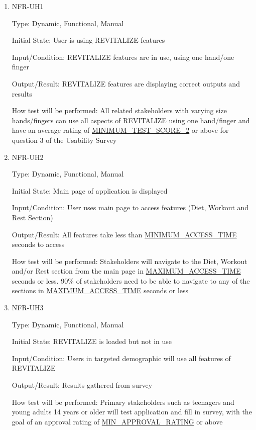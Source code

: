 \documentclass[12pt, titlepage]{article}
\begin{document}
\begin{enumerate}
	
	\item{NFR-UH1\\}
	
	Type: Dynamic, Functional, Manual
	
	Initial State: User is using REVITALIZE features
	
	Input/Condition: REVITALIZE features are in use, using one hand/one finger
	
	Output/Result: REVITALIZE features are displaying correct outputs and results
	
	How test will be performed: All related stakeholders with varying size hands/fingers can use all aspects of REVITALIZE using one hand/finger and have an average rating of \hyperlink{MINIMUM_TEST_SCORE_2}{MINIMUM\_TEST\_SCORE\_2} or above for question 3 of the Usability Survey
	
	\item{NFR-UH2\\}
	
	Type: Dynamic, Functional, Manual
	
	Initial State: Main page of application is displayed
	
	Input/Condition: User uses main page to access features (Diet, Workout and Rest Section)
	
	Output/Result: All features take less than \hyperlink{MINIMUM_ACCESS_TIME}{MINIMUM\_ACCESS\_TIME} seconds to access
	
	How test will be performed: Stakeholders will navigate to the Diet, Workout and/or Rest section from the main page in \hyperlink{MAXIMUM_ACCESS_TIME}{MAXIMUM\_ACCESS\_TIME} seconds or less. 90\% of stakeholders need to be able to navigate to any of the sections in \hyperlink{MAXIMUM_ACCESS_TIME}{MAXIMUM\_ACCESS\_TIME} seconds or less
	
	\item{NFR-UH3\\}
	
	Type: Dynamic, Functional, Manual
	
	Initial State: REVITALIZE is loaded but not in use
	
	Input/Condition: Users in targeted demographic will use all features of REVITALIZE
	
	Output/Result: Results gathered from survey
	
	How test will be performed: Primary stakeholders such as teenagers and young adults 14 years or older will test application and fill in survey, with the goal of an approval rating of \hyperlink{MIN_APPROVAL_RATING}{MIN\_APPROVAL\_RATING} or above
	

\end{enumerate}
\end{document}
